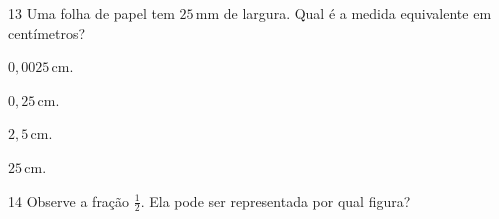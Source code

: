 
\num{13} Uma folha de papel tem $25\,\text{mm}$ de largura. Qual é a medida equivalente
em centímetros?

\begin{escolha}
\item $0,0025\,\text{cm}$.
\item $0,25\,\text{cm}$.
\item $2,5\,\text{cm}$.
\item $25\,\text{cm}$.
\end{escolha}



\pagebreak
\num{14} Observe a fração $\frac{1}{2}$. Ela pode ser representada por qual figura?

